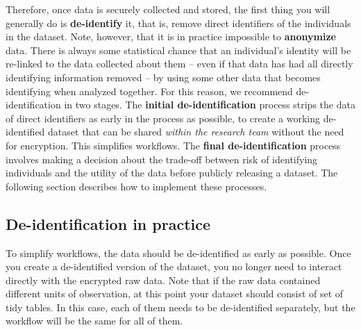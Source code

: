 Therefore, once data is securely collected and stored,
the first thing you will generally do is \textbf{de-identify} it,
that is, remove direct identifiers of the individuals in the dataset.
Note, however, that it is in practice impossible to \textbf{anonymize} data.
There is always some statistical chance that an individual's identity
will be re-linked to the data collected about them
-- even if that data has had all directly identifying information removed --
by using some other data that becomes identifying when analyzed together.
For this reason, we recommend de-identification in two stages.
The \textbf{initial de-identification} process strips the data of direct identifiers
as early in the process as possible,
to create a working de-identified dataset that
can be shared \textit{within the research team} without the need for encryption.
This simplifies workflows.
The \textbf{final de-identification} process involves
making a decision about the trade-off between
risk of identifying individuals and the utility of the data
before publicly releasing a dataset.
The following section describes how to implement these processes.


\subsection{De-identification in practice}

To simplify workflows, the data should be de-identified as early as possible.
Once you create a de-identified version of the dataset,
you no longer need to interact directly with the encrypted raw data.
Note that if the raw data contained different units of observation,
at this point your dataset should consist of set of tidy tables.
In this case, each of them needs to be de-identified separately, but
the workflow will be the same for all of them.

